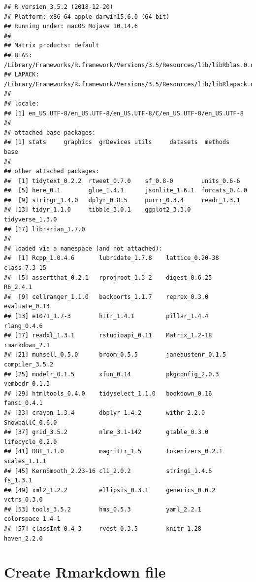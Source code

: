\documentclass[]{book}
\begin{document}
\begin{verbatim}
## R version 3.5.2 (2018-12-20)
## Platform: x86_64-apple-darwin15.6.0 (64-bit)
## Running under: macOS Mojave 10.14.6
## 
## Matrix products: default
## BLAS: /Library/Frameworks/R.framework/Versions/3.5/Resources/lib/libRblas.0.dylib
## LAPACK: /Library/Frameworks/R.framework/Versions/3.5/Resources/lib/libRlapack.dylib
## 
## locale:
## [1] en_US.UTF-8/en_US.UTF-8/en_US.UTF-8/C/en_US.UTF-8/en_US.UTF-8
## 
## attached base packages:
## [1] stats     graphics  grDevices utils     datasets  methods   base     
## 
## other attached packages:
##  [1] tidytext_0.2.2  rtweet_0.7.0    sf_0.8-0        units_0.6-6    
##  [5] here_0.1        glue_1.4.1      jsonlite_1.6.1  forcats_0.4.0  
##  [9] stringr_1.4.0   dplyr_0.8.5     purrr_0.3.4     readr_1.3.1    
## [13] tidyr_1.1.0     tibble_3.0.1    ggplot2_3.3.0   tidyverse_1.3.0
## [17] librarian_1.7.0
## 
## loaded via a namespace (and not attached):
##  [1] Rcpp_1.0.4.6       lubridate_1.7.8    lattice_0.20-38    class_7.3-15      
##  [5] assertthat_0.2.1   rprojroot_1.3-2    digest_0.6.25      R6_2.4.1          
##  [9] cellranger_1.1.0   backports_1.1.7    reprex_0.3.0       evaluate_0.14     
## [13] e1071_1.7-3        httr_1.4.1         pillar_1.4.4       rlang_0.4.6       
## [17] readxl_1.3.1       rstudioapi_0.11    Matrix_1.2-18      rmarkdown_2.1     
## [21] munsell_0.5.0      broom_0.5.5        janeaustenr_0.1.5  compiler_3.5.2    
## [25] modelr_0.1.5       xfun_0.14          pkgconfig_2.0.3    vembedr_0.1.3     
## [29] htmltools_0.4.0    tidyselect_1.1.0   bookdown_0.16      fansi_0.4.1       
## [33] crayon_1.3.4       dbplyr_1.4.2       withr_2.2.0        SnowballC_0.6.0   
## [37] grid_3.5.2         nlme_3.1-142       gtable_0.3.0       lifecycle_0.2.0   
## [41] DBI_1.1.0          magrittr_1.5       tokenizers_0.2.1   scales_1.1.1      
## [45] KernSmooth_2.23-16 cli_2.0.2          stringi_1.4.6      fs_1.3.1          
## [49] xml2_1.2.2         ellipsis_0.3.1     generics_0.0.2     vctrs_0.3.0       
## [53] tools_3.5.2        hms_0.5.3          yaml_2.2.1         colorspace_1.4-1  
## [57] classInt_0.4-3     rvest_0.3.5        knitr_1.28         haven_2.2.0
\end{verbatim}

\hypertarget{create-rmarkdown-file}{%
\section{Create Rmarkdown file}\label{create-rmarkdown-file}}
\end{document}
